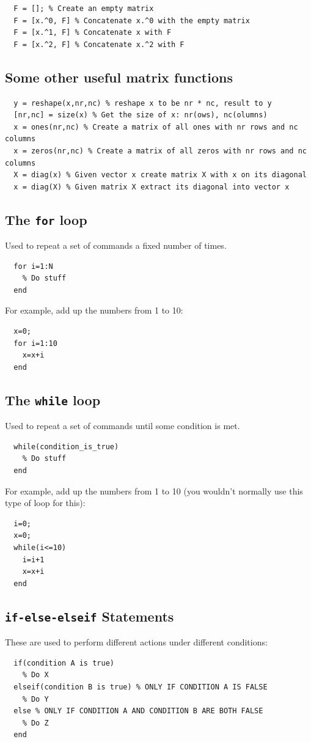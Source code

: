 \documentclass[12pt,a4paper]{tufte-handout}
\begin{document}
\begin{lstlisting}
  F = []; % Create an empty matrix
  F = [x.^0, F] % Concatenate x.^0 with the empty matrix
  F = [x.^1, F] % Concatenate x with F
  F = [x.^2, F] % Concatenate x.^2 with F
\end{lstlisting}

\subsection{Some other useful matrix functions}
\begin{lstlisting}
  y = reshape(x,nr,nc) % reshape x to be nr * nc, result to y
  [nr,nc] = size(x) % Get the size of x: nr(ows), nc(olumns)
  x = ones(nr,nc) % Create a matrix of all ones with nr rows and nc columns
  x = zeros(nr,nc) % Create a matrix of all zeros with nr rows and nc columns
  X = diag(x) % Given vector x create matrix X with x on its diagonal
  x = diag(X) % Given matrix X extract its diagonal into vector x
\end{lstlisting}

\subsection{The \texttt{for} loop}
Used to repeat a set of commands a fixed number of times.
\begin{lstlisting}
  for i=1:N
    % Do stuff
  end
\end{lstlisting}

For example, add up the numbers from 1 to 10:
\begin{lstlisting}
  x=0;
  for i=1:10
    x=x+i
  end
\end{lstlisting}

\subsection{The \texttt{while} loop}
Used to repeat a set of commands until some condition is met.
\begin{lstlisting}
  while(condition_is_true)
    % Do stuff
  end
\end{lstlisting}
For example, add up the numbers from 1 to 10 (you wouldn't normally use this type of loop for this):
\begin{lstlisting}
  i=0;
  x=0;
  while(i<=10)
    i=i+1
    x=x+i
  end
\end{lstlisting}

\subsection{\texttt{if-else-elseif} Statements}
These are used to perform different actions under different conditions:
\begin{lstlisting}
  if(condition A is true)
    % Do X
  elseif(condition B is true) % ONLY IF CONDITION A IS FALSE
    % Do Y
  else % ONLY IF CONDITION A AND CONDITION B ARE BOTH FALSE
    % Do Z
  end
\end{lstlisting}
\end{document}
